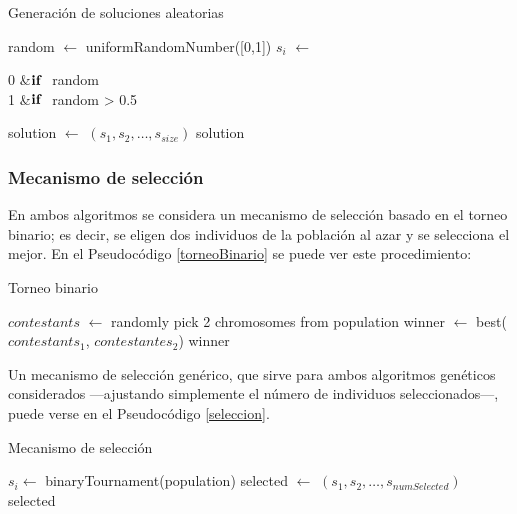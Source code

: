\documentclass[a4paper, 11pt, titlepage]{article}
\begin{document}
    \begin{algorithm}
        \caption{Generación de soluciones aleatorias}\label{randomSol}
        \begin{algorithmic}[1]
                \State random $\gets$ uniformRandomNumber([0,1])
                \State $s_i$ $\gets$ \begin{cases}
                    0 &$\textrm{\textbf{if} }$ random  \\
                    1 &$\textrm{\textbf{if} }$ random  > 0.5
                \end{cases}
            \EndFor
            \State solution $\gets$ $(s_1, s_2, \dots, s_{size})$
            \State \Return solution
        \end{algorithmic}
    \end{algorithm}


    \subsubsection*{Mecanismo de selección}

    En ambos algoritmos se considera un mecanismo de selección basado en el torneo binario; es decir, se eligen dos individuos de la población al azar y se selecciona el mejor. En el Pseudocódigo \ref{torneoBinario} se puede ver este procedimiento:

    \begin{algorithm}
        \caption{Torneo binario}\label{torneoBinario}
        \begin{algorithmic}[1]
            \State $contestants$ $\gets$ randomly pick 2 chromosomes from population
            \State winner $\gets$ best($contestants_1$, $contestantes_2$)
            \State \Return winner
        \end{algorithmic}
    \end{algorithm}

    Un mecanismo de selección genérico, que sirve para ambos algoritmos genéticos considerados ---ajustando simplemente el número de individuos seleccionados---, puede verse en el Pseudocódigo \ref{seleccion}.

    \begin{algorithm}
        \caption{Mecanismo de selección}\label{seleccion}
        \begin{algorithmic}[1]
                \State $s_i \gets$ binaryTournament(population)
            \EndFor
            \State selected $\gets$ $(s_1, s_2, \dots, s_{numSelected})$
            \State \Return selected
        \end{algorithmic}
    \end{algorithm}
\end{document}

